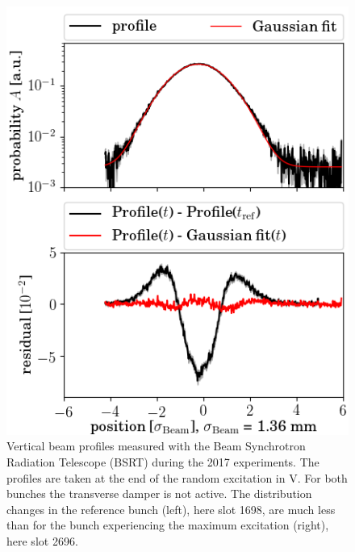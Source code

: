 \documentclass[%
 reprint,
 amsmath,amssymb,
 aps,
prstab,
longbibliography
]{revtex4-1}
\begin{document}
\begin{figure}
\begin{minipage}[t]{0.49\linewidth}
		\includegraphics[width=1.0\linewidth]{profile_v_ranv_slot_1532.png}
	\end{minipage}
	\caption{\label{fig:ranexpprof}Vertical beam profiles measured with the Beam Synchrotron Radiation Telescope (BSRT) during the 2017 experiments. The profiles are taken at the end of the random excitation in V. For both bunches the transverse damper is not active. The distribution changes in the reference bunch (left), here slot 1698, are much less than for the bunch experiencing the maximum excitation (right), here slot 2696.}
      \end{figure}
\end{document}
